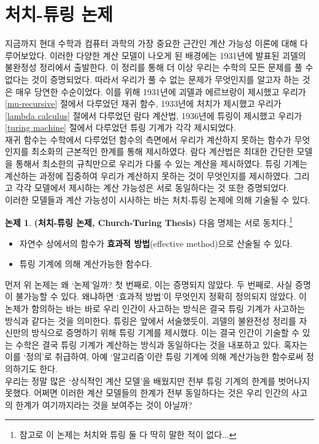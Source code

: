 \documentclass[b5paper, 11pt]{book}
\theoremstyle{definition}
\newtheorem{thesis}[defn]{논제}
\begin{document}
\section{처치-튜링 논제}
지금까지 현대 수학과 컴퓨터 과학의 가장 중요한 근간인 계산 가능성 이론에 대해 다루어보았다. 이러한 다양한 계산 모델이 나오게 된 배경에는 1931년에 발표된 괴델의 불완정성 정리에서 출발한다. 이 정리를 통해 더 이상 우리는 수학의 모든 문제를 풀 수 없다는 것이 증명되었다. 따라서 우리가 풀 수 없는 문제가 무엇인지를 알고자 하는 것은 매우 당연한 수순이었다. 이를 위해 1931년에 괴델과 에르브랑이 제시했고 우리가 \ref{mu-recursive} 절에서 다루었던 재귀 함수, 1933년에 처치가 제시했고 우리가 \ref{lambda calculus} 절에서 다루었던 람다 계산법, 1936년에 튜링이 제시했고 우리가 \ref{turing machine} 절에서 다루었던 튜링 기계가 각각 제시되었다. \\
재귀 함수는 수학에서 다루었던 함수의 측면에서 우리가 계산하지 못하는 함수가 무엇인지를 최소화의 근본적인 한계를 통해 제시하였다. 람다 계산법은 최대한 간단한 모델을 통해서 최소한의 규칙만으로 우리가 다룰 수 있는 계산을 제시하였다. 튜링 기계는 계산하는 과정에 집중하여 우리가 계산하지 못하는 것이 무엇인지를 제시하였다. 그리고 각각 모델에서 제시하는 계산 가능성은 서로 동일하다는 것 또한 증명되었다. \\
이러한 모델들과 계산 가능성이 시사하는 바는 처치-튜링 논제에 의해 기술될 수 있다.
\begin{thesis}\label{ct thesis}
    \textbf{(처치-튜링 논제, Church-Turing Thesis)} 다음 명제는 서로 동치다.\footnote{참고로 이 논제는 처치와 튜링 둘 다 딱히 말한 적이 없다...}
    \begin{itemize}
        \item 자연수 상에서의 함수가 \textbf{효과적 방법}(effective method)으로 산술될 수 있다.
        \item 튜링 기계에 의해 계산가능한 함수다.
    \end{itemize}
\end{thesis}
먼저 위 논제는 왜 `논제'일까? 첫 번째로, 이는 증명되지 않았다. 두 번째로, 사실 증명이 불가능할 수 있다. 왜냐하면 `효과적 방법'이 무엇인지 정확히 정의되지 않았다. 이 논제가 함의하는 바는 바로 우리 인간이 사고하는 방식은 결국 튜링 기계가 사고하는 방식과 같다는 것을 의미한다. 튜링은 앞에서 서술했듯이, 괴델의 불완전성 정리를 자신만의 방식으로 증명하기 위해 튜링 기계를 제시했다. 이는 결국 인간이 기술할 수 있는 수학은 결국 튜링 기계가 계산하는 방식과 동일하다는 것을 내포하고 있다.   혹자는 이를 `정의'로 취급하여, 아예 `알고리즘'이란 튜링 기계에 의해 계산가능한 함수로써 정의하기도 한다.\\
우리는 정말 많은 `상식적인 계산 모델'을 배웠지만 전부 튜링 기계의 한계를 벗어나지 못했다. 어쩌면 이러한 계산 모델들의 한계가 전부 동일하다는 것은 우리 인간의 사고의 한계가 여기까지라는 것을 보여주는 것이 아닐까?
\end{document}
